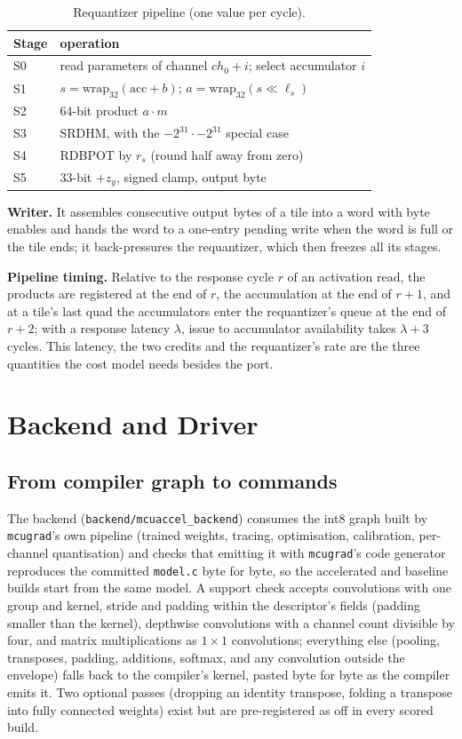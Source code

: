 \documentclass[journal]{IEEEtran}
\begin{document}
\begin{table}[t]\centering
\caption{Requantizer pipeline (one value per cycle).}\label{tab:rq}
\footnotesize\setlength{\tabcolsep}{3pt}
\begin{tabular}{ll}\toprule
Stage & operation\\\midrule
S0 & read parameters of channel $ch_0+i$; select accumulator $i$\\
S1 & $s=\mathrm{wrap}_{32}(\mathrm{acc}+b)$; $a=\mathrm{wrap}_{32}(s\ll\ell_s)$\\
S2 & 64-bit product $a\cdot m$\\
S3 & SRDHM, with the $-2^{31}\cdot-2^{31}$ special case\\
S4 & RDBPOT by $r_s$ (round half away from zero)\\
S5 & 33-bit $+z_y$, signed clamp, output byte\\\bottomrule
\end{tabular}
\end{table}

\textbf{Writer.} It assembles consecutive output bytes of a tile into a word with byte enables and hands the word to a one-entry pending write when the word is full or the tile ends; it back-pressures the requantizer, which then freezes all its stages.

\textbf{Pipeline timing.} Relative to the response cycle $r$ of an activation read, the products are registered at the end of $r$, the accumulation at the end of $r+1$, and at a tile's last quad the accumulators enter the requantizer's queue at the end of $r+2$; with a response latency $\lambda$, issue to accumulator availability takes $\lambda+3$ cycles. This latency, the two credits and the requantizer's rate are the three quantities the cost model needs besides the port.

\section{Backend and Driver}\label{sec:backend}
\subsection{From compiler graph to commands}
The backend (\texttt{backend/mcuaccel\_backend}) consumes the int8 graph built by \texttt{mcugrad}'s own pipeline (trained weights, tracing, optimisation, calibration, per-channel quantisation) and checks that emitting it with \texttt{mcugrad}'s code generator reproduces the committed \texttt{model.c} byte for byte, so the accelerated and baseline builds start from the same model. A support check accepts convolutions with one group and kernel, stride and padding within the descriptor's fields (padding smaller than the kernel), depthwise convolutions with a channel count divisible by four, and matrix multiplications as $1\times1$ convolutions; everything else (pooling, transposes, padding, additions, softmax, and any convolution outside the envelope) falls back to the compiler's kernel, pasted byte for byte as the compiler emits it. Two optional passes (dropping an identity transpose, folding a transpose into fully connected weights) exist but are pre-registered as off in every scored build.
\end{document}
